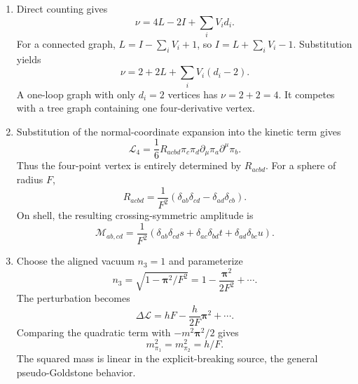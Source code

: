 \begin{enumerate}
  \begin{enumerate}
    \item[(a)]
    Direct counting gives
    \[
      \nu=4L-2I+\sum_iV_id_i.
    \]
    For a connected graph,
    \(L=I-\sum_iV_i+1\), so \(I=L+\sum_iV_i-1\).
    Substitution yields
    \[
      \boxed{\nu=2+2L+\sum_iV_i(d_i-2).}
    \]
    A one-loop graph with only \(d_i=2\) vertices has
    \(\nu=2+2=4\).  It competes with a tree graph containing one
    four-derivative vertex.
    \item[(b)]
    Substitution of the normal-coordinate expansion into the kinetic term
    gives
    \[
      \mathcal L_4
        =\frac16R_{acbd}\pi_c\pi_d
          \partial_\mu\pi_a\partial^\mu\pi_b.
    \]
    Thus the four-point vertex is entirely determined by \(R_{acbd}\).
    For a sphere of radius \(F\),
    \[
      R_{acbd}=\frac1{F^2}
        (\delta_{ab}\delta_{cd}-\delta_{ad}\delta_{cb}).
    \]
    On shell, the resulting crossing-symmetric amplitude is
    \[
      \boxed{\mathcal M_{ab,cd}
        =\frac1{F^2}\left(
         \delta_{ab}\delta_{cd}s+
         \delta_{ac}\delta_{bd}t+
         \delta_{ad}\delta_{bc}u\right).}
    \]
    \item[(c)]
    Choose the aligned vacuum \(n_3=1\) and parameterize
    \[
      n_3=\sqrt{1-\boldsymbol\pi^2/F^2}
        =1-\frac{\boldsymbol\pi^2}{2F^2}+\cdots.
    \]
    The perturbation becomes
    \[
      \Delta\mathcal L=hF-\frac{h}{2F}\boldsymbol\pi^2+\cdots.
    \]
    Comparing the quadratic term with
    \(-m^2\boldsymbol\pi^2/2\) gives
    \[
      \boxed{m_{\pi_1}^2=m_{\pi_2}^2=h/F.}
    \]
    The squared mass is linear in the explicit-breaking source, the general
    pseudo-Goldstone behavior.
  \end{enumerate}


\end{enumerate}
